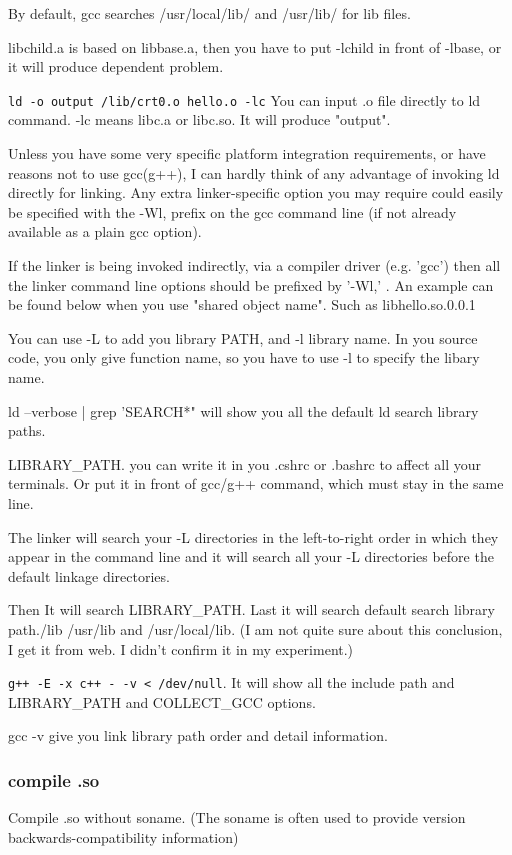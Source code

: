 \documentclass[paper=8.5in:11in, twoside, 12pt, pagesize=pdftex]{book}
\begin{document}
	By default, gcc searches /usr/local/lib/ and /usr/lib/ for lib files.
			 
	libchild.a is based on libbase.a, then you have to put -lchild in front of -lbase, or it will produce dependent problem. 
			 
	\verb=ld -o output /lib/crt0.o hello.o -lc= You can input .o file directly to ld command. -lc means libc.a or libc.so. It will produce "output". 
					 
	Unless you have some very specific platform integration requirements, or have reasons not to use gcc(g++), I can hardly think of any advantage of invoking ld directly for linking. Any extra linker-specific option you may require could easily be specified with the -Wl, prefix on the gcc command line (if not already available as a plain gcc option).

	If the linker is being invoked indirectly, via a compiler driver (e.g. 'gcc') then all the linker command line options should be prefixed by '-Wl,' . An example can be found below when you use "shared object name". Such as libhello.so.0.0.1

   You can use -L to add you library PATH, and -l library name. In you source code, you only give function name, so you have to use -l to specify the libary name. 

	ld --verbose | grep 'SEARCH*" will show you all the default ld search library paths.
			
   LIBRARY\_PATH. you can write it in you .cshrc or .bashrc to affect all your terminals. Or put it in front of gcc/g++ command, which must stay in the same line.        
	 
	The linker will search your -L directories in the left-to-right order in which they appear in the command line and it will search all your -L directories before the default linkage directories.
	
	Then It will search LIBRARY\_PATH. Last it will search default search library path./lib /usr/lib and /usr/local/lib. (I am not quite sure about this conclusion, I get it from web. I didn't confirm it in my experiment.)
	
	\verb=g++ -E -x c++ - -v < /dev/null=. It will show all the include path and LIBRARY\_PATH and COLLECT\_GCC options.

	gcc -v give you link library path order and detail information. 

\subsubsection{compile .so}
  Compile .so without soname. (The soname is often used to provide version backwards-compatibility information)
\end{document}
